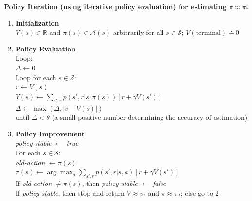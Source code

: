 \textbf{Policy Iteration (using iterative policy evaluation) for estimating $\pi \approx \pi_*$}
\begin{enumerate}
	\item \textbf{Initialization}\\
	      $V(s) \in \mathbb{R}$ and $\pi(s) \in \mathcal{A}(s)$ arbitrarily for all $s \in \mathcal{S}$; $V(\text{terminal}) \doteq 0$

	\item \textbf{Policy Evaluation}\\
	      Loop:\\
	      \hspace*{1em} $\Delta \leftarrow 0$\\
	      \hspace*{1em} Loop for each $s \in \mathcal{S}$:\\
	      \hspace*{2em} $v \leftarrow V(s)$\\
	      \hspace*{2em} $V(s) \leftarrow \sum_{s', r} p(s', r | s, \pi(s)) [r + \gamma V(s')]$\\
	      \hspace*{2em} $\Delta \leftarrow \max(\Delta, |v - V(s)|)$\\
	      until $\Delta < \theta$ (a small positive number determining the accuracy of estimation)

	\item \textbf{Policy Improvement}\\
	      \textit{policy-stable} $\leftarrow$ \textit{true}\\
	      For each $s \in \mathcal{S}$:\\
	      \hspace*{1em} \textit{old-action} $\leftarrow \pi(s)$\\
	      \hspace*{1em} $\pi(s) \leftarrow \arg\max_a \sum_{s', r} p(s', r | s, a) [r + \gamma V(s')]$\\
	      \hspace*{1em} If \textit{old-action} $\neq \pi(s)$, then \textit{policy-stable} $\leftarrow$ \textit{false}\\
	      If \textit{policy-stable}, then stop and return $V \approx v_*$ and $\pi \approx \pi_*$; else go to 2
\end{enumerate}
